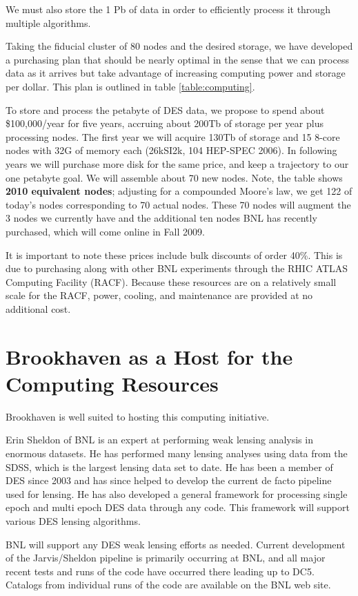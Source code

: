 \documentclass[12pt]{article}
\begin{document}
We must also store the 1 Pb of data in order to efficiently process it through
multiple algorithms.  

Taking the fiducial cluster of 80 nodes and the desired storage, we have
developed a purchasing plan that should be nearly optimal in the sense that
we can process data as it arrives but take advantage of increasing computing
power and storage per dollar.  This plan is outlined in table \ref{table:computing}.

To store and process the petabyte of DES data, we propose to spend about
\$100,000/year for five years, accruing about 200Tb of storage per year plus
processing nodes.  The first year we will acquire 130Tb of storage and 15
8-core nodes with 32G of memory each (26kSI2k, 104 HEP-SPEC 2006).  In
following years we will purchase more disk for the same price, and keep a
trajectory to our one petabyte goal.   We will assemble about 70 new nodes.
Note, the table shows {\bf 2010 equivalent nodes}; adjusting for a compounded
Moore's law, we get 122 of today's nodes corresponding to 70 actual nodes.
These 70 nodes will augment the 3 nodes we currently have and the additional
ten nodes BNL has recently purchased, which will come online in Fall 2009.

It is important to note these prices include bulk discounts of order 40\%.
This is due to purchasing along with other BNL experiments through the RHIC
ATLAS Computing Facility (RACF).  Because these resources are on a
relatively small scale for the RACF, power, cooling, and maintenance are
provided at no additional cost.  


\section{Brookhaven as a Host for the Computing Resources}

Brookhaven is well suited to hosting this computing initiative. 

Erin Sheldon of BNL is an expert at performing weak lensing analysis in
enormous datasets. He has performed many lensing analyses using data from the
SDSS, which is the largest lensing data set to date.   He has been a member of
DES since 2003 and has since helped to develop the current de facto
pipeline used for lensing. He has also developed a general framework for
processing single epoch and multi epoch DES data through any code.  This
framework will support various DES lensing algorithms.

BNL will support any DES weak lensing efforts as needed.  Current development
of the Jarvis/Sheldon pipeline is primarily occurring at BNL, and all major
recent tests and runs of the code have occurred there leading up to DC5.  Catalogs
from individual runs of the code are available on the BNL web site.
\end{document}

